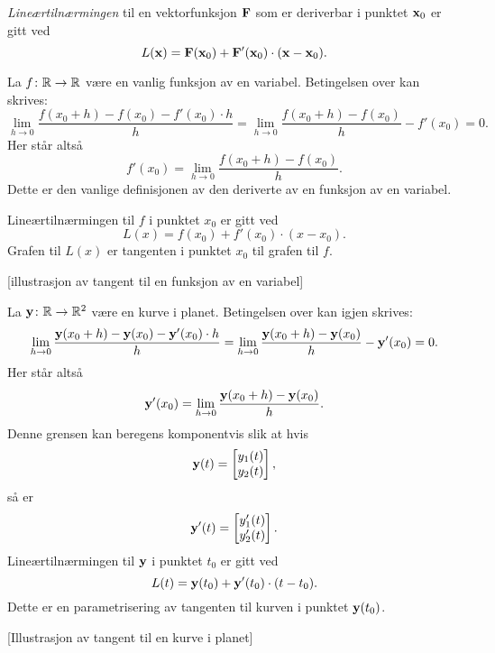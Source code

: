 \begin{definisjon}
  {\em Lineærtilnærmingen} til en vektorfunksjon $\mathbf{F}$ som er deriverbar i punktet $\mathbf{x}_0$ er
  gitt ved
  $$L(\mathbf{x}) = \mathbf{F}(\mathbf{x}_0) + \mathbf{F}'(\mathbf{x}_0) \cdot (\mathbf{x} - \mathbf{x}_0).$$
\end{definisjon}

\begin{eksempel}
  La $f \colon \mathbb{R} \to \mathbb{R}$ være en vanlig funksjon av en variabel. Betingelsen over kan skrives:
  $$\lim_{h\to 0} \frac{f(x_0+h) - f(x_0) - f'(x_0) \cdot h}{h} =
  \lim_{h\to 0} \frac{f(x_0+h) - f(x_0)}{h} - f'(x_0) = 0.$$
  Her står altså 
  $$f'(x_0) = \lim_{h\to 0} \frac{f(x_0+h) - f(x_0)}{h}.$$
  Dette er den vanlige definisjonen av den deriverte av en funksjon av en variabel.

  Lineærtilnærmingen til $f$ i punktet $x_0$ er gitt ved
  $$L(x) = f(x_0) + f'(x_0) \cdot (x - x_0).$$
  Grafen til $L(x)$ er tangenten i punktet $x_0$ til grafen til $f$.
\end{eksempel}
[illustrasjon av tangent til en funksjon av en variabel]

\begin{eksempel}
  La $\mathbf{y} \colon \mathbb{R} \to \mathbb{R}^2$ være en kurve i planet. Betingelsen over kan igjen skrives:
  $$\lim_{h\to 0} \frac{\mathbf{y}(x_0+h) - \mathbf{y}(x_0) - \mathbf{y}'(x_0) \cdot h}{h} =
  \lim_{h\to 0} \frac{\mathbf{y}(x_0+h) - \mathbf{y}(x_0)}{h} - \mathbf{y}'(x_0) = 0.$$
  Her står altså 
  $$\mathbf{y}'(x_0) = \lim_{h\to 0} \frac{\mathbf{y}(x_0+h) - \mathbf{y}(x_0)}{h}.$$
  Denne grensen kan beregens komponentvis slik at hvis 
  $$\mathbf{y}(t) =
  \begin{bmatrix} y_1(t) \\ y_2(t) \end{bmatrix},$$ så er 
  $$\mathbf{y}'(t) =
  \begin{bmatrix} y_1'(t) \\ y_2'(t) \end{bmatrix}.$$
  Lineærtilnærmingen til $\mathbf{y}$ i punktet $t_0$ er gitt ved
  $$L(t) = \mathbf{y}(t_0) + \mathbf{y}'(t_0) \cdot (t - t_0).$$
  Dette er en parametrisering av tangenten til kurven i punktet $\mathbf{y}(t_0)$.
\end{eksempel}
[Illustrasjon av tangent til en kurve i planet]
